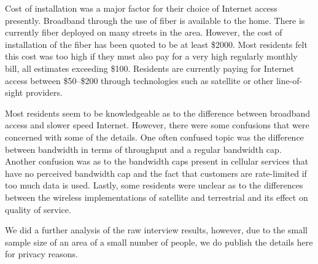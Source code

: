Cost of installation was a major factor for their choice of Internet access presently. Broadband
through the use of fiber is available to the home. There is currently fiber deployed on many
streets in the area. However, the cost of installation of the fiber has been quoted to be at least \$2000.
Most residents felt this cost was too high if they must also pay for a very high regularly monthly bill, all
estimates exceeding \$100. Residents are currently paying for Internet access between \$50--\$200
through technologies such as satellite or other line-of-sight providers.

Most residents seem to be knowledgeable as to the difference between broadband access and slower speed Internet.
However, there were some confusions that were concerned with some of the details. One often confused topic was
the difference between bandwidth in terms of throughput and a regular bandwidth cap. Another confusion was
as to the bandwidth caps present in cellular services that have no perceived bandwidth cap and the fact that
customers are rate-limited if too much data is used. Lastly, some residents were unclear as to the differences
between the wireless implementations of satellite and terrestrial and its effect on quality of service.

We did a further analysis of the raw interview results, however, due to the small sample size of an area of a small number of people,
we do publish the details here for privacy reasons.


